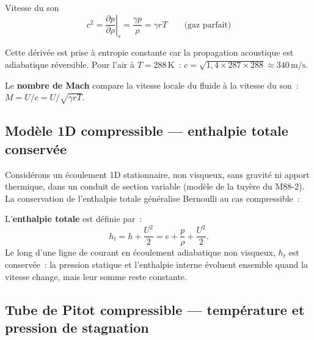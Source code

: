 \documentclass[11pt,a4paper]{report}
\newcommand{\pd}[2]{\dfrac{\partial #1}{\partial #2}}
\begin{document}
\begin{defbox}{Vitesse du son}
\[
  c^2 = \left.\pd{p}{\rho}\right|_s = \frac{\gamma p}{\rho} = \gamma r T
  \qquad \text{(gaz parfait)}
\]
\end{defbox}

Cette d\'eriv\'ee est prise \`a entropie constante car la propagation acoustique est
adiabatique r\'eversible. Pour l'air \`a $T = 288\,\mathrm{K}$~:
$c = \sqrt{1{,}4 \times 287 \times 288} \approx 340\,\mathrm{m/s}$.

Le \textbf{nombre de Mach} compare la vitesse locale du fluide \`a la vitesse du son~:
$M = U/c = U/\sqrt{\gamma r T}$.

\begin{center}
\end{center}

\subsection{Mod\`ele 1D compressible --- enthalpie totale conserv\'ee}

Consid\'erons un \'ecoulement 1D stationnaire, non visqueux, sans gravit\'e ni apport
thermique, dans un conduit de section variable (mod\`ele de la tuy\`ere du M88-2).
La conservation de l'enthalpie totale g\'en\'eralise Bernoulli au cas compressible~:

L'\textbf{enthalpie totale} est d\'efinie par~:
\[
  h_t = h + \frac{U^2}{2} = e + \frac{p}{\rho} + \frac{U^2}{2}.
\]
Le long d'une ligne de courant en \'ecoulement adiabatique non visqueux, $h_t$ est
conserv\'ee~: la pression statique et l'enthalpie interne \'evoluent ensemble quand la
vitesse change, mais leur somme reste constante.

\subsection{Tube de Pitot compressible --- temp\'erature et pression de stagnation}
\end{document}
